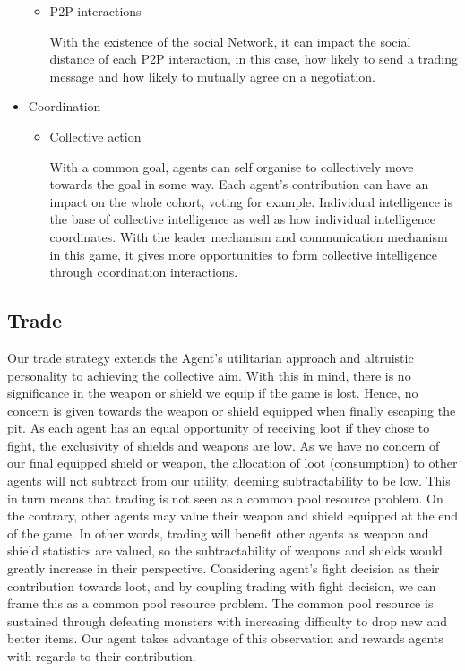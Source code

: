 \begin{itemize}
\begin{itemize}
\begin{flushleft}
                \end{flushleft}
        \item P2P interactions
                \begin{flushleft}
                \setlength{\parindent}{2em}
                With the existence of the social Network, it can impact the social distance of each P2P interaction, in this case, how likely to send a trading message and how likely to mutually agree on a negotiation. 
                \end{flushleft}
    \end{itemize}
  \item Coordination
    \begin{itemize}
        \item Collective action
                \begin{flushleft}
                \setlength{\parindent}{2em}
                With a common goal, agents can self organise to collectively move towards the goal in some way. Each agent's contribution can have an impact on the whole cohort, voting for example. Individual intelligence is the base of collective intelligence as well as how individual intelligence coordinates. With the leader mechanism and communication mechanism in this game, it gives more opportunities to form collective intelligence through coordination interactions.
                \end{flushleft}
    \end{itemize}
\end{itemize}

\subsection{Trade}

\noindent Our trade strategy extends the Agent’s utilitarian approach and altruistic personality to achieving the collective aim. With this in mind, there is no significance in the weapon or shield we equip if the game is lost. Hence, no concern is given towards the weapon or shield equipped when finally escaping the pit. As each agent has an equal opportunity of receiving loot if they chose to fight, the exclusivity of shields and weapons are low. As we have no concern of our final equipped shield or weapon, the allocation of loot (consumption) to other agents will not subtract from our utility, deeming subtractability to be low. This in turn means that trading is not seen as a common pool resource problem.
\noindent On the contrary, other agents may value their weapon and shield equipped at the end of the game. In other words, trading will benefit other agents as weapon and shield statistics are valued, so the subtractability of weapons and shields would greatly increase in their perspective.
Considering agent’s fight decision as their contribution towards loot, and by coupling trading with fight decision, we can frame this as a common pool resource problem. The common pool resource is sustained through defeating monsters with increasing difficulty to drop new and better items. Our agent takes advantage of this observation and rewards agents with regards to their contribution.


